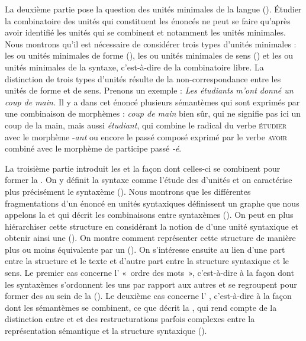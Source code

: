 La deuxième partie pose la question des unités minimales de la langue (). Étudier la combinatoire des unités qui constituent les énoncés ne peut se faire qu’après avoir identifié les unités qui se combinent et notamment les unités minimales. Nous montrons qu’il est nécessaire de considérer trois types d’unités minimales : les  ou unités minimales de forme (), les  ou unités minimales de sens () et les  ou unités minimales de la syntaxe, c’est-à-dire de la combinatoire libre. La distinction de trois types d’unités résulte de la non-correspondance entre les unités de forme et de sens. Prenons un exemple :
\ea
    \textit{Les étudiants m’ont donné un coup de main.}
\z
Il y a dans cet énoncé plusieurs sémantèmes qui sont exprimés par une combinaison de morphèmes : \textit{coup de main} bien sûr, qui ne signifie pas ici un coup de la main, mais aussi \textit{étudiant}, qui combine le radical du verbe \textsc{étudier} avec le morphème -\textit{ant} ou encore le passé composé exprimé par le verbe \textsc{avoir} combiné avec le morphème de participe passé \textit{{}-é}.

La troisième partie introduit les  et la façon dont celles-ci se combinent pour former la . On y définit la syntaxe comme l’étude des  d’unités et on caractérise plus précisément le syntaxème (). Nous montrons que les différentes fragmentations d’un énoncé en unités syntaxiques définissent un graphe que nous appelons la  et qui décrit les combinaisons entre syntaxèmes (). On peut en plus hiérarchiser cette structure en considérant la notion de  d’une unité syntaxique et obtenir ainsi une  (). On montre comment représenter cette structure de manière plus ou moins équivalente par un  (). On s’intéresse ensuite au lien d’une part entre la structure et le texte et d’autre part entre la structure syntaxique et le sens. Le premier cas concerne l’ «~ordre des mots~», c’est-à-dire à la façon dont les syntaxèmes s’ordonnent les uns par rapport aux autres et se regroupent pour former des  au sein de la  (). Le deuxième cas concerne l’ , c’est-à-dire à la façon dont les sémantèmes se combinent, ce que décrit la , qui rend compte de la distinction entre  et  et des restructurations parfois complexes entre la représentation sémantique et la structure syntaxique ().

